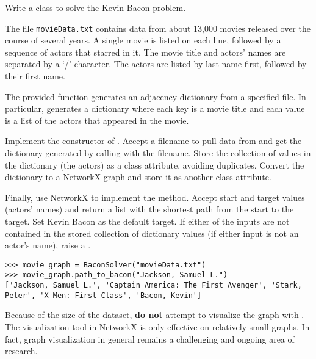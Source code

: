 \begin{problem}
Write a  class to solve the Kevin Bacon problem.

The file \texttt{movieData.txt} contains data from about 13,000 movies released over the course of several years.
A single movie is listed on each line, followed by a sequence of actors that starred in it.
The movie title and actors' names are separated by a `/' character.
The actors are listed by last name first, followed by their first name.

The provided  function generates an adjacency dictionary from a specified file.
In particular,  generates a dictionary where each key is a movie title and each value is a list of the actors that appeared in the movie.

Implement the constructor of .
Accept a filename to pull data from and get the dictionary generated by calling  with the filename.
Store the collection of values in the dictionary (the actors) as a class attribute, avoiding duplicates.
Convert the dictionary to a NetworkX graph and store it as another class attribute.

Finally, use NetworkX to implement the  method.
Accept start and target values (actors' names) and return a list with the shortest path from the start to the target.
Set Kevin Bacon as the default target.
If either of the inputs are not contained in the stored collection of dictionary values (if either input is not an actor's name), raise a .

\begin{lstlisting}
>>> movie_graph = BaconSolver("movieData.txt")
>>> movie_graph.path_to_bacon("Jackson, Samuel L.")
['Jackson, Samuel L.', 'Captain America: The First Avenger', 'Stark,
Peter', 'X-Men: First Class', 'Bacon, Kevin']
\end{lstlisting}

\begin{warn}
Because of the size of the dataset, \textbf{do not} attempt to visualize the graph with .
The visualization tool in NetworkX is only effective on relatively small graphs.
In fact, graph visualization in general remains a challenging and ongoing area of research.
\end{warn}
\end{problem}

